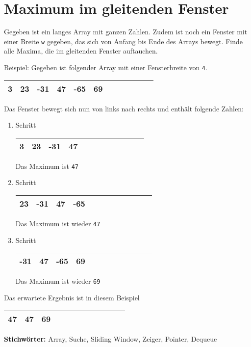 \documentclass[babel]{book}
\begin{document}
\section{Maximum im gleitenden Fenster}
\begin{examplei}
Gegeben ist ein langes Array mit ganzen Zahlen. Zudem ist noch ein Fenster mit einer Breite \lstinline|w| gegeben, das sich von Anfang bis Ende des Arrays bewegt. Finde alle Maxima, die im gleitenden Fenster auftauchen.

Beispiel:
Gegeben ist folgender Array mit einer Fensterbreite von \lstinline|4|. 	

\begin{tabular}{|l|l|l|l|l|l|l|l|l|l|l|l|} 
\hline
3 & 23 & -31 & 47 & -65 & 69 \\
\hline
\end{tabular}
Das Fenster bewegt sich nun von links nach rechts und enthält folgende Zahlen:
\begin{enumerate}
\item Schritt

\begin{tabular}{|l|l|l|l|l|l|l|l|l|l|l|l|} 
\hline
3 & 23 & -31 & 47 \\
\hline
\end{tabular}

Das Maximum ist \lstinline|47|
\item Schritt

\begin{tabular}{|l|l|l|l|l|l|l|l|l|l|l|l|} 
\hline
23 & -31 & 47 & -65 \\
\hline
\end{tabular}

Das Maximum ist wieder \lstinline|47|	

\item Schritt
		
\begin{tabular}{|l|l|l|l|l|l|l|l|l|l|l|l|} 
\hline
-31 & 47 & -65 & 69 \\
\hline
\end{tabular}

Das Maximum ist wieder \lstinline|69|
\end{enumerate}

Das erwartete Ergebnis ist in diesem Beispiel 
\begin{tabular}{|l|l|l|l|l|l|l|l|l|l|l|l|} 
	\hline
	47 & 47 & 69 \\
	\hline
\end{tabular}

\end{examplei}
{\bf Stichwörter:} Array, Suche, Sliding Window, Zeiger, Pointer, Dequeue
\end{document}
